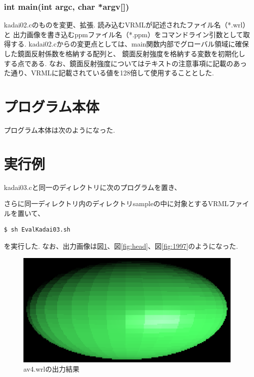 \documentclass[a4j,dvipdfmx]{jsarticle}
\begin{document}
\subsubsection{int main(int argc, char *argv[])}
kadai02.cのものを変更、拡張.
読み込むVRMLが記述されたファイル名（*.wrl）と
出力画像を書き込むppmファイル名（*.ppm）をコマンドライン引数として取得する.
kadai02.cからの変更点としては、main関数内部でグローバル領域に確保した鏡面反射係数を格納する配列と、
鏡面反射強度を格納する変数を初期化しする点である.
なお、鏡面反射強度についてはテキストの注意事項に記載のあった通り、VRMLに記載されている値を128倍して使用することとした.
\section{プログラム本体}
プログラム本体は次のようになった.



\section{実行例}
kadai03.cと同一のディレクトリに次のプログラムを置き、

さらに同一ディレクトリ内のディレクトリsampleの中に対象とするVRMLファイルを置いて、
\begin{lstlisting}
$ sh EvalKadai03.sh
\end{lstlisting}
を実行した.
なお、出力画像は図\ref{fig:av4}、図\ref{fig:head}、図\ref{fig:1997}のようになった.

\begin{figure}[hp]
  \begin{center}
    \includegraphics[clip,scale=0.5]{images/Kadai03ForAv4.eps}
    \caption{av4.wrlの出力結果}
    \label{fig:av4}
  \end{center}
\end{figure}
\end{document}

